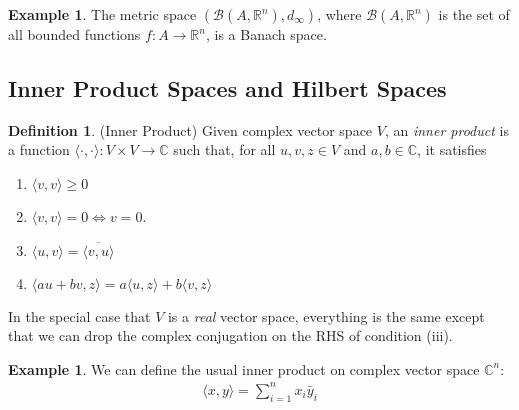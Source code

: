 \documentclass[12pt]{article}
\numberwithin{equation}{section} %
\theoremstyle{plain}
\theoremstyle{definition}
\newtheorem{defn}[thm]{Definition}
\newtheorem{ex}[thm]{Example}
\theoremstyle{remark}
\newcommand{\ra}{\rightarrow}
\newcommand{\R}{\mathbb{R}}
\newcommand{\C}{\mathbb{C}}
\newcommand{\Cn}{\mathbb{C}^n}
\begin{document}
\begin{ex}
The metric space $\left(\mathscr{B}(A,\R^n), d_\infty\right)$,
where $\mathscr{B}(A,\R^n)$ is the set of all bounded functions
$f:A\rightarrow \R^n$, is a Banach space.
\end{ex}



\clearpage
\subsection{Inner Product Spaces and Hilbert Spaces}

\begin{defn}(Inner Product)
Given complex vector space $V$, an \emph{inner product} is a function
$\langle \cdot, \cdot \rangle: V\times V \ra \C$ such that, for all
$u,v,z\in V$ and $a,b\in\C$, it satisfies
\begin{enumerate}[label=(\roman*)]
  \item $\langle v,v \rangle \geq 0$
  \item $\langle v,v\rangle =0 \iff v=0$.
  \item $\langle u,v\rangle = \overline{\langle v,u\rangle}$
  \item $\langle au + bv, z\rangle
    = a\langle u, z\rangle + b\langle v, z\rangle$
\end{enumerate}
In the special case that $V$ is a \emph{real} vector space, everything
is the same except that we can drop the complex conjugation on the RHS
of condition (iii).
\end{defn}

\begin{ex}
We can define the usual inner product on complex vector space $\Cn$:
\begin{align*}
  \langle x,y\rangle = \sum_{i=1}^n x_i \bar{y}_i
\end{align*}
\end{ex}
\end{document}
